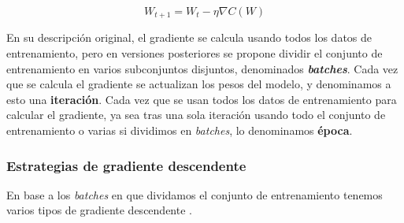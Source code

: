 \begin{equation}\label{eq:GD}
W_{t+1}=W_t - \eta \nabla C(W)
\end{equation}

En su descripción original, el gradiente se calcula usando todos los datos de entrenamiento, pero en versiones posteriores se propone dividir el conjunto de entrenamiento en varios subconjuntos disjuntos, denominados \textbf{\textit{batches}}. Cada vez que se calcula el gradiente se actualizan los pesos del modelo, y denominamos a esto una \textbf{iteración}. Cada vez que se usan todos los datos de entrenamiento para calcular el gradiente, ya sea tras una sola iteración usando todo el conjunto de entrenamiento o varias si dividimos en \textit{batches}, lo denominamos \textbf{época}.



\subsubsection{Estrategias de gradiente descendente} \label{sec:estrategias}

En base a los \textit{batches} en que dividamos el conjunto de entrenamiento tenemos varios tipos de gradiente descendente \cite{GoodFellowBook}.

